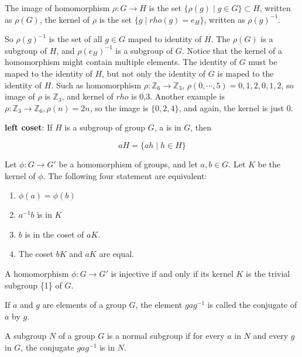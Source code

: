 \documentclass{tufte-handout}
\newcommand{\Z}{\mathbb{Z}}
\begin{document}
\begin{definition}
	\normalfont
	The image of homomorphism $\rho: G\rightarrow H$ is the set $\{\rho(g)\mid g\in G\}\subset H$, written as $\rho(G)$, the kernel of $\rho$ is the set $\{g\mid rho(g)=e_{H}\}$, written as $\rho(g)^{-1}$.
\end{definition}

So $\rho(g)^{-1}$ is the set of all $g\in G$ maped to identity of $H$. The $\rho(G)$ is a subgroup of $H$, and $\rho(e_{H})^{-1}$ is a subgroup of $G$. Notice that the kernel of a homomorphism might contain multiple elements. The identity of $G$ must be maped to the identity of $H$, but not only the identity of $G$ is maped to the identity of $H$. Such as homomorphism $\rho: \Z_6\rightarrow \Z_3$, $\rho(0,\cdots,5)=0,1,2,0,1,2$, so image of $\rho$ is $\Z_3$, and kernel of $rho$ is {0,3}. Another example is $\rho: \Z_3\rightarrow \Z_6, \rho(n)=2n$, so the image is $\{0,2,4\}$, and again, the kernel is just 0. 

\textbf{left coset}: If $H$ is a subgroup of group $G$, a is in $G$, then 

\begin{equation}
	aH = \{ah\mid h\in H\}
\end{equation}

\begin{proposition}
	\normalfont
	Let $\phi: G\rightarrow G'$ be a homomorphism of groups, and let $a, b\in G$. Let $K$ be the kernel of $\phi$. The following four statement are equivalent:
	\begin{enumerate}
		\item $\phi(a)=\phi(b)$
		\item $a^{-1}b$ is in $K$
		\item $b$ is in the coset of $aK$.
		\item The coset $bK$ and $aK$ are equal.
	\end{enumerate}
\end{proposition}

\begin{corollary}
	\normalfont
	A homomorphism $\phi: G\rightarrow G'$ is injective if and only if its kernel $K$ is the trivial subgroup \{1\} of $G$.
\end{corollary}

If $a$ and $g$ are elements of a group $G$, the element $gag^{-1}$ is called the conjugate of $a$ by $g$.

\begin{definition}
	\normalfont
	A subgroup $N$ of a group $G$ is a normal subgroup if for every $a$ in $N$ and every $g$ in $G$, the conjugate $gag^{-1}$ is in $N$.
\end{definition}
\end{document}
